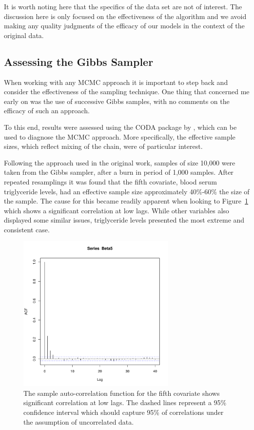 \documentclass{uwstat572}
\begin{document}
It is worth noting here that the specifics of the data set are not of interest. The discussion here is only focused on the effectiveness of the algorithm and we avoid making any quality judgments of the efficacy of our models in the context of the original data.

\subsection{Assessing the Gibbs Sampler}
When working with any MCMC approach it is important to step back and consider the effectiveness of the sampling technique. One thing that concerned me early on was the use of successive Gibbs samples, with no comments on the efficacy of such an approach.

To this end, results were assessed using the CODA package by \cite{codapackage}, which can be used to diagnose the MCMC approach. More specifically, the effective sample sizes, which reflect mixing of the chain, were of particular interest.

Following the approach used in the original work, samples of size 10,000 were taken from the Gibbs sampler, after a burn in period of 1,000 samples. After repeated resamplings it was found that the fifth covariate, blood serum triglyceride levels, had an effective sample size approximately 40\%-60\% the size of the sample. The cause for this became readily apparent when looking to Figure~\ref{Var5} which shows a significant correlation at low lags. While other variables also displayed some similar issues, triglyceride levels presented the most extreme and consistent case.

\begin{figure}\label{Var5}
  \centering
    \includegraphics[width=0.7\textwidth]{Beta5ACFunsub.pdf}
  \caption{The sample auto-correlation function for the fifth covariate shows significant correlation at low lags. The dashed lines represent a 95\% confidence interval which should capture 95\% of correlations under the assumption of uncorrelated data.}
\end{figure}
\end{document}
